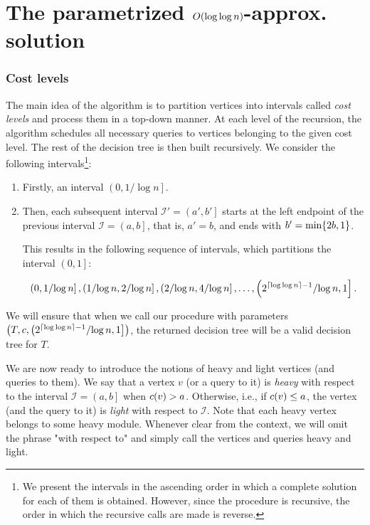 \section{The parametrized $O\mathopen{}\left( \log\log n \right)$-approx. solution}\label{parametrizedSolution}
\subsubsection{Cost levels}\label{costLevels}
The main idea of the algorithm is to partition vertices into intervals called \textit{cost levels} and process them in a top-down manner. At each level of the recursion, the algorithm schedules all necessary queries to vertices belonging to the given cost level. The rest of the decision tree is then built recursively. We consider the following intervals\footnote{We present the intervals in the ascending order in which a complete solution for each of them is obtained. However, since the procedure is recursive, the order in which the recursive calls are made is reverse.}:

\begin{enumerate}
    \item Firstly, an interval $\left( 0,{1}/{\log n}\right]$.
    \item Then, each subsequent interval $\mathcal{I}'=\left(a',b'\right]$ starts at the left endpoint of the previous interval $\mathcal{I}=\left(a,b\right]$, that is, $a'=b$, and ends with $b'=\min\mathopen{}\left\{ 2b, 1 \right\}$. 
    
    This results in the following sequence of intervals, which partitions the interval $\left(0,1\right]$:
    
    $$\left( 0,{1}/{\log n}\right],\left({1}/{\log n},{2}/{\log n}\right], \left({2}/{\log n},{4}/{\log n}\right],\dots, \left({2^{\mathopen{}\left\lceil \log\log n \right\rceil-1}}/{\log n},1\right].$$
\end{enumerate}

We will ensure that when we call our procedure with parameters $\mathopen{}\left( T, c, \left({2^{\mathopen{}\left\lceil \log\log n \right\rceil-1}}/{\log n},1\right] \right)$, the returned decision tree will be a valid decision tree for $T$.

We are now ready to introduce the notions of heavy and light vertices (and queries to them). We say that a vertex $v$ (or a query to it) is \textit{heavy} with respect to the interval $\mathcal{I}=\left(a,b\right]$ when $c\mathopen{}\left( v \right)>a$. Otherwise, i.e., if $c\mathopen{}\left( v \right)\leq a$, the vertex (and the query to it) is \textit{light} with respect to $\mathcal{I}$. Note that each heavy vertex belongs to some heavy module. Whenever clear from the context, we will omit the phrase "with respect to" and simply call the vertices and queries heavy and light.


